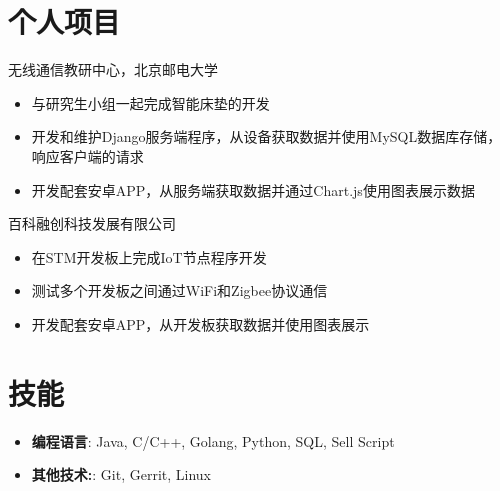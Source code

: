 \documentclass{resume}
\begin{document}
\vspace{6pt}

\section{个人项目}
无线通信教研中心，北京邮电大学
\begin{itemize}[parsep=0.25ex]
    \item 与研究生小组一起完成智能床垫的开发
    \item 开发和维护Django服务端程序，从设备获取数据并使用MySQL数据库存储，响应客户端的请求
    \item 开发配套安卓APP，从服务端获取数据并通过Chart.js使用图表展示数据
\end{itemize}
百科融创科技发展有限公司
\begin{itemize}[parsep=0.25ex]
    \item 在STM开发板上完成IoT节点程序开发
    \item 测试多个开发板之间通过WiFi和Zigbee协议通信
    \item 开发配套安卓APP，从开发板获取数据并使用图表展示
\end{itemize}

\vspace{6pt}

\section{技能}
\begin{itemize}[parsep=0.25ex]
    \item
          \textbf{编程语言}:
          Java, C/C++, Golang, Python, SQL, Sell Script
    \item
          \textbf{其他技术:}:
          Git, Gerrit, Linux
\end{itemize}
\end{document}
